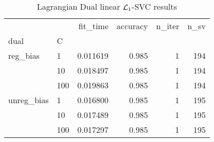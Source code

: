 \begin{table}[H]
\centering
\caption{Lagrangian Dual linear $\protect \mathcal{L}_1$-SVC results}
\label{linear_lagrangian_dual_l1_svc_cv_results}
\begin{tabular}{llrrrr}
\toprule
           &     &  fit\_time &  accuracy &  n\_iter &  n\_sv \\
dual & C &           &           &         &       \\
\midrule
reg\_bias & 1   &  0.011619 &     0.985 &       1 &   194 \\
           & 10  &  0.018497 &     0.985 &       1 &   194 \\
           & 100 &  0.019863 &     0.985 &       1 &   194 \\
unreg\_bias & 1   &  0.016800 &     0.985 &       1 &   195 \\
           & 10  &  0.017489 &     0.985 &       1 &   195 \\
           & 100 &  0.017297 &     0.985 &       1 &   195 \\
\bottomrule
\end{tabular}
\end{table}
